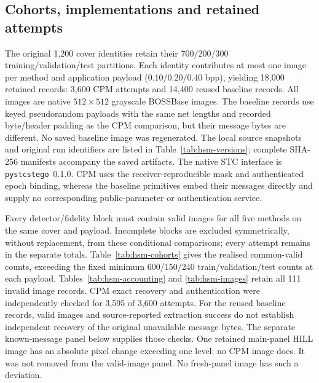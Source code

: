 \documentclass[journal]{IEEEtran}
\theoremstyle{definition}
\theoremstyle{game}
\begin{document}
\subsection{Cohorts, implementations and retained attempts}
The original 1,200 cover identities retain their 700/200/300
training/validation/test partitions. Each identity contributes at most
one image per method and application payload (0.10/0.20/0.40 bpp), yielding
18,000 retained records: 3,600 CPM attempts and 14,400 reused
baseline records. All images are native $512\times512$ grayscale
BOSSBase images. The baseline records use keyed pseudorandom payloads
with the same net lengths and recorded byte/header padding as the CPM
comparison, but their message bytes are different. No saved baseline
image was regenerated. The local source snapshots and original run
identifiers are listed in Table~\ref{tab:hsm-versions}; complete SHA-256
manifests accompany the saved artifacts. The native STC interface is
\texttt{pystcstego}~0.1.0. CPM uses the receiver-reproducible mask and
authenticated epoch binding, whereas the baseline primitives embed their
messages directly and supply no corresponding public-parameter or
authentication service.

Every detector/fidelity block must contain valid images for all five
methods on the same cover and payload. Incomplete blocks are excluded
symmetrically, without replacement, from these conditional comparisons;
every attempt remains in the separate totals. Table~\ref{tab:hsm-cohorts}
gives the realised common-valid counts, exceeding the fixed minimum
600/150/240 train/validation/test counts at each payload.
Tables~\ref{tab:hsm-accounting} and \ref{tab:hsm-images} retain all 111
invalid image records. CPM exact recovery and authentication were
independently checked for 3,595 of 3,600 attempts. For the reused baseline
records, valid images and source-reported extraction success do not
establish independent recovery of the original unavailable message
bytes. The separate known-message panel below supplies those checks.
One retained main-panel HILL image has an absolute pixel change exceeding
one level; no CPM image does. It was not removed from the valid-image
panel. No fresh-panel image has such a deviation.
\end{document}
